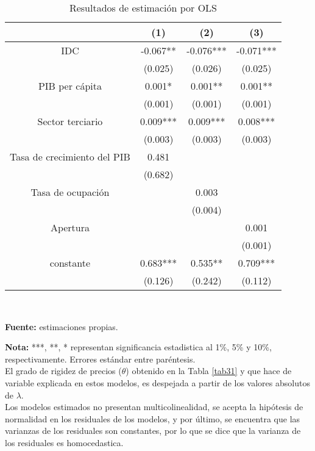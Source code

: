 \begin{table}%
\centering
\caption{Resultados de  estimación por OLS}
\begin{tabular}{cccc}
\hline
& (1)   & (2)  &  (3) \\
\hline
\hline
\vspace{-0.3cm}    IDC  & -0.067** & -0.076*** & -0.071*** \\
& \scriptsize{(0.025)} & \scriptsize{(0.026)} & \scriptsize{(0.025)} \\
\vspace{-0.3cm}    PIB per cápita  & 0.001* & 0.001** & 0.001** \\
& \scriptsize{(0.001)} & \scriptsize{(0.001)} & \scriptsize{(0.001)} \\
\vspace{-0.3cm}    Sector terciario  & 0.009*** & 0.009*** & 0.008*** \\
& \scriptsize{(0.003)} & \scriptsize{(0.003)} & \scriptsize{(0.003)} \\
\vspace{-0.3cm}    Tasa de crecimiento del PIB & 0.481 &       &  \\
& \scriptsize{(0.682)} &       &  \\
\vspace{-0.3cm}    Tasa de ocupación &       & 0.003 &  \\
&       & \scriptsize{(0.004)} &  \\
\vspace{-0.3cm}    Apertura &       &       & 0.001 \\
&       &       & \scriptsize{(0.001)} \\
\vspace{-0.3cm}     constante & 0.683*** & 0.535** & 0.709*** \\
& \scriptsize{(0.126)} & \scriptsize{(0.242)} & \scriptsize{(0.112)} \\
\hline
\end{tabular}
\label{mco}\\
  \raggedright  \scriptsize \textbf{Fuente:} estimaciones propias. \\
\raggedright  \scriptsize \textbf{Nota:} ***,  **, * representan significancia estadistica al 1\%, 5\% y 10\%, respectivamente. Errores estándar entre paréntesis.\\
El grado de rigidez de precios ($\theta$) obtenido en la Tabla \ref{tab31} y que hace de variable explicada en estos modelos, es despejada a partir de los valores absolutos de $\lambda$.\\
Los modelos estimados no presentan multicolinealidad, se acepta la hipótesis de normalidad en los residuales de los  modelos, y por último, se encuentra que  las varianzas de los
residuales son constantes, por lo que se dice que la varianza de los residuales es homocedastica.
\end{table}%

